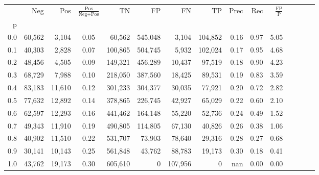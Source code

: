\begin{tabular}{rrrcrrrrrrrrrrr}
\toprule
{} &     Neg &     Pos & $\frac{\text{Pos}}{\text{Neg}+\text{Pos}}$ &       TN &       FP &       FN &       TP &  Prec &   Rec & $\frac{\text{FP}}{\text{P}}$ \\
p   &         &         &                                            &          &          &          &          &       &       &                              \\
\midrule
0.0 &  60,562 &   3,104 &                                       0.05 &   60,562 &  545,048 &    3,104 &  104,852 &  0.16 &  0.97 &                         5.05 \\
0.1 &  40,303 &   2,828 &                                       0.07 &  100,865 &  504,745 &    5,932 &  102,024 &  0.17 &  0.95 &                         4.68 \\
0.2 &  48,456 &   4,505 &                                       0.09 &  149,321 &  456,289 &   10,437 &   97,519 &  0.18 &  0.90 &                         4.23 \\
0.3 &  68,729 &   7,988 &                                       0.10 &  218,050 &  387,560 &   18,425 &   89,531 &  0.19 &  0.83 &                         3.59 \\
0.4 &  83,183 &  11,610 &                                       0.12 &  301,233 &  304,377 &   30,035 &   77,921 &  0.20 &  0.72 &                         2.82 \\
0.5 &  77,632 &  12,892 &                                       0.14 &  378,865 &  226,745 &   42,927 &   65,029 &  0.22 &  0.60 &                         2.10 \\
0.6 &  62,597 &  12,293 &                                       0.16 &  441,462 &  164,148 &   55,220 &   52,736 &  0.24 &  0.49 &                         1.52 \\
0.7 &  49,343 &  11,910 &                                       0.19 &  490,805 &  114,805 &   67,130 &   40,826 &  0.26 &  0.38 &                         1.06 \\
0.8 &  40,902 &  11,510 &                                       0.22 &  531,707 &   73,903 &   78,640 &   29,316 &  0.28 &  0.27 &                         0.68 \\
0.9 &  30,141 &  10,143 &                                       0.25 &  561,848 &   43,762 &   88,783 &   19,173 &  0.30 &  0.18 &                         0.41 \\
1.0 &  43,762 &  19,173 &                                       0.30 &  605,610 &        0 &  107,956 &        0 &   nan &  0.00 &                         0.00 \\
\bottomrule
\end{tabular}
